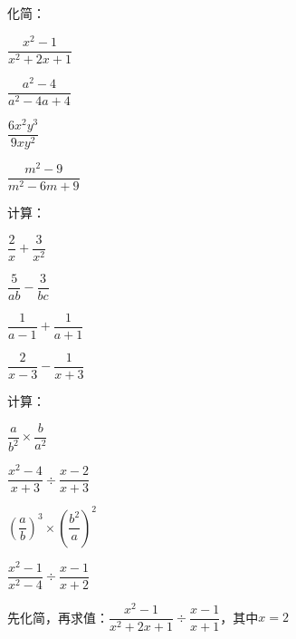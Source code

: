 \documentclass[a4paper,12pt]{ctexart}
\begin{document}
\begin{exercise}
\item 化简：
  \begin{subexercise}
    \item $\dfrac{x^2-1}{x^2+2x+1}$
    \item $\dfrac{a^2-4}{a^2-4a+4}$
    \item $\dfrac{6x^2y^3}{9xy^2}$
    \item $\dfrac{m^2-9}{m^2-6m+9}$
  \end{subexercise}

\item 计算：
  \begin{subexercise}
    \item $\dfrac{2}{x}+\dfrac{3}{x^2}$
    \item $\dfrac{5}{ab}-\dfrac{3}{bc}$
    \item $\dfrac{1}{a-1}+\dfrac{1}{a+1}$
    \item $\dfrac{2}{x-3}-\dfrac{1}{x+3}$
  \end{subexercise}

\item 计算：
  \begin{subexercise}
    \item $\dfrac{a}{b^2}\times\dfrac{b}{a^2}$
    \item $\dfrac{x^2-4}{x+3}\div\dfrac{x-2}{x+3}$
    \item $\left(\dfrac{a}{b}\right)^3\times\left(\dfrac{b^2}{a}\right)^2$
    \item $\dfrac{x^2-1}{x^2-4}\div\dfrac{x-1}{x+2}$
  \end{subexercise}

\item 先化简，再求值：$\dfrac{x^2-1}{x^2+2x+1}\div\dfrac{x-1}{x+1}$，其中$x=2$
\end{exercise}

\newpage


\end{document}
